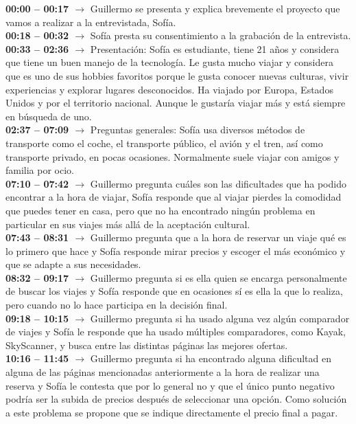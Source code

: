 \noindent\textbf{00:00 -- 00:17 $\rightarrow$} Guillermo se presenta y explica brevemente el proyecto que vamos a realizar a la entrevistada, Sofía. \\
\textbf{00:18 -- 00:32 $\rightarrow$} Sofía presta su consentimiento a la grabación de la entrevista. \\
\textbf{00:33 -- 02:36 $\rightarrow$} Presentación: Sofía es estudiante, tiene 21 años y considera que tiene un buen manejo de la tecnología. Le gusta mucho viajar y considera que es uno de sus hobbies favoritos porque le gusta conocer nuevas culturas, vivir experiencias y explorar lugares desconocidos. Ha viajado por Europa, Estados Unidos y por el territorio nacional. Aunque le gustaría viajar más y está siempre en búsqueda de uno. \\
\textbf{02:37 -- 07:09 $\rightarrow$} Preguntas generales: Sofía usa diversos métodos de transporte como el coche, el transporte público, el avión y el tren, así como transporte privado, en pocas ocasiones. Normalmente suele viajar con amigos y familia por ocio. \\
\textbf{07:10 -- 07:42 $\rightarrow$} Guillermo pregunta cuáles son las dificultades que ha podido encontrar a la hora de viajar, Sofía responde que al viajar pierdes la comodidad que puedes tener en casa, pero que no ha encontrado ningún problema en particular en sus viajes más allá de la aceptación cultural. \\
\textbf{07:43 -- 08:31 $\rightarrow$} Guillermo pregunta que a la hora de reservar un viaje qué es lo primero que hace y Sofía responde mirar precios y escoger el más económico y que se adapte a sus necesidades. \\
\textbf{08:32 -- 09:17 $\rightarrow$} Guillermo pregunta si es ella quien se encarga personalmente de buscar los viajes y Sofía responde que en ocasiones sí es ella la que lo realiza, pero cuando no lo hace participa en la decisión final. \\
\textbf{09:18 -- 10:15 $\rightarrow$} Guillermo pregunta si ha usado alguna vez algún comparador de viajes y Sofía le responde que ha usado múltiples comparadores, como Kayak, SkyScanner, y busca entre las distintas páginas las mejores ofertas. \\
\textbf{10:16 -- 11:45 $\rightarrow$} Guillermo pregunta si ha encontrado alguna dificultad en alguna de las páginas mencionadas anteriormente a la hora de realizar una reserva y Sofía le contesta que por lo general no y que el único punto negativo podría ser la subida de precios después de seleccionar una opción. Como solución a este problema se propone que se indique directamente el precio final a pagar. \\
